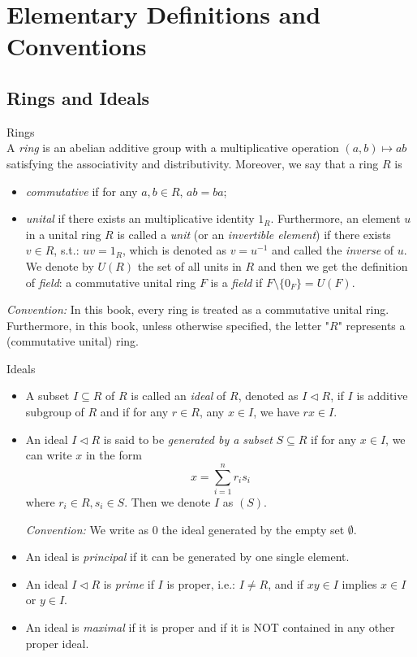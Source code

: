 \chapter{Elementary Definitions and Conventions}

\section{Rings and Ideals}

\begin{definition}{Rings}\\
A \textit{ring} is an abelian additive group with a multiplicative operation $(a,b) \mapsto ab$ satisfying the associativity and distributivity. Moreover, we say that a ring $R$ is
\begin{itemize}
    \item \textit{commutative} if for any $a,b \in R$, $ab=ba$;
    \item \textit{unital} if there exists an multiplicative identity $1_R$. Furthermore, an element $u$ in a unital ring $R$ is called a \textit{unit} (or an \textit{invertible element}) if there exists $v \in R$, s.t.: $uv=1_R$, which is denoted as $v=u^{-1}$ and called the \textit{inverse} of $u$. We denote by $U(R)$ the set of all units in $R$ and then we get the definition of \textit{field}: a commutative unital ring $F$ is a \textit{field} if $F \setminus \{0_F\}=U(F)$.
\end{itemize}
\end{definition}

\noindent\textit{Convention:} In this book, every ring is treated as a commutative unital ring. Furthermore, in this book, unless otherwise specified, the letter "$R$" represents a (commutative unital) ring.

\begin{definition}{Ideals}
\begin{itemize}
    \item A subset $I \subseteq R$ of $R$ is called an \textit{ideal} of $R$, denoted as $I \triangleleft R$, if $I$ is additive subgroup of $R$ and if for any $r\in R$, any $x\in I$, we have $rx \in I$.

    \item An ideal $I \triangleleft R$ is said to be \textit{generated by a subset} $S \subseteq R$ if for any $x \in I$, we can write $x$ in the form
    $$x= \sum_{i=1}^n r_is_i$$
    where $r_i \in R, s_i \in S$. Then we denote $I$ as $(S)$.
    
    \noindent\textit{Convention:} We write as $0$ the ideal generated by the empty set $\emptyset$.

    \item An ideal is \textit{principal} if it can be generated by one single element.
    \item An ideal $I \triangleleft R$ is \textit{prime} if $I$ is proper, i.e.: $I \neq R$, and if $xy \in I$ implies $x \in I$ or $y \in I$.
    \item An ideal is \textit{maximal} if it is proper and if it is NOT contained in any other proper ideal.
\end{itemize}
\end{definition}

